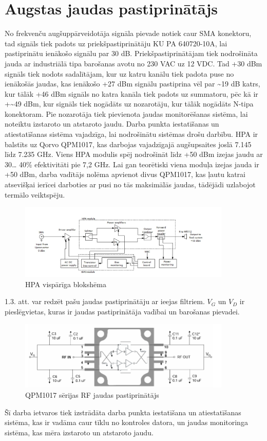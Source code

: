 \section{Augstas jaudas pastiprinātājs}
No frekvenču augšuppārveidotāja signāla pievade notiek caur SMA konektoru, tad signāls tiek padots uz priekšpastiprinātāju KU PA 640720-10A\cite{pre_amplifier}, lai pastiprinātu ienākošo signālu par 30 dB. Priekšpastiprinātājam tiek nodrošināta jauda ar industriālā tipa barošanas avotu no 230 VAC uz 12 VDC. Tad +30 dBm signāls tiek nodots sadalītājam, kur uz katru kanālu tiek padota puse no ienākošās jaudas, kas ienākošo +27 dBm signālu pastiprina vēl par \textasciitilde19 dB katrs, kur tālāk +46 dBm signāls no katra kanāla tiek padots uz summatoru, pēc kā ir +\textasciitilde49 dBm, kur signāls tiek nogādāts uz nozarotāju, kur tālāk nogādāts N-tipa konektoram. Pie nozarotāja tiek pievienota jaudas monitorēšanas sistēma, lai noteiktu izstaroto un atstaroto jaudu. Darba punkta iestatīšanas un atiestatīšanas sistēma vajadzīga, lai nodrošinātu sistēmas drošu darbību.
HPA ir balstīts uz Qorvo QPM1017, kas darbojas vajadzīgajā augšupsaites joslā 7.145 līdz 7.235 GHz. Viens HPA modulis spēj nodrošināt līdz +50 dBm izejas jaudu ar 30… 40\% efektivitāti pie 7,2 GHz. Lai gan teorētiski viena moduļa izejas jauda ir +50 dBm, darba vadītājs nolēma apvienot divus QPM1017, kas ļautu katrai atsevišķai ierīcei darboties ar pusi no tās maksimālās jaudas, tādējādi uzlabojot termālo veiktspēju.
\begin{figure}[H]
	\centering
    \includegraphics[width=0.9\textwidth]{pictures/HPA.jpg}\hspace{1cm}
    \caption{HPA vispārīga blokshēma \cite{bleideris2024xband}}
\end{figure}
1.3. att. var redzēt pašu jaudas pastiprinātāju ar ieejas filtriem. $V_{G}$ un $V_{D}$ ir pieslēgvietas, kuras ir jaudas pastiprinātāja vadībai un barošanas pievadei.
\begin{figure}[H]
	\centering
    \includegraphics[width=0.9\textwidth]{pictures/pa.png}\hspace{1cm}
    \caption{QPM1017 sērijas RF jaudas pastiprinātājs}
\end{figure}
Šī darba ietvaros tiek izstrādāta darba punkta iestatīšana un atiestatīšanas sistēma, kas ir vadāma caur tīklu no kontroles datora, un jaudas monitoringa sistēma, kas mēra izstaroto un atstaroto jaudu.
